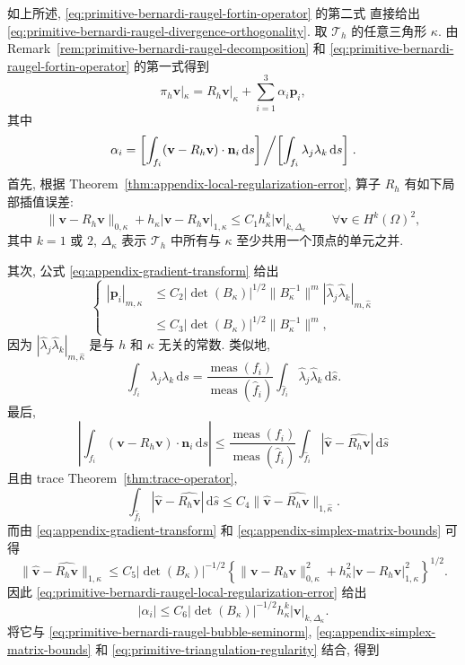 \begin{Proof}
如上所述, \eqref{eq:primitive-bernardi-raugel-fortin-operator} 的第二式
直接给出 \eqref{eq:primitive-bernardi-raugel-divergence-orthogonality}.
取 $\mathcal{T}_h$ 的任意三角形 $\kappa$. 由
Remark~\ref{rem:primitive-bernardi-raugel-decomposition} 和
\eqref{eq:primitive-bernardi-raugel-fortin-operator} 的第一式得到
\[
\pi_h\mathbf v|_\kappa
=R_h\mathbf v|_\kappa+\sum_{i=1}^3\alpha_i\mathbf p_i,
\]
其中
\[
\alpha_i=
\left[\int_{f_i}(\mathbf v-R_h\mathbf v)\cdot\mathbf n_i\,\mathrm ds\right]
\left/\left[\int_{f_i}\lambda_j\lambda_k\,\mathrm ds\right]\right. .
\]
首先, 根据 Theorem~\ref{thm:appendix-local-regularization-error},
算子 $R_h$ 有如下局部插值误差:
\begin{equation}\label{eq:primitive-bernardi-raugel-local-regularization-error}
\|\mathbf v-R_h\mathbf v\|_{0,\kappa}
+h_\kappa|\mathbf v-R_h\mathbf v|_{1,\kappa}
\leq C_1h_\kappa^k|\mathbf v|_{k,\Delta_\kappa}
\qquad\forall\mathbf v\in H^k(\Omega)^2,
\end{equation}
其中 $k=1$ 或 $2$, $\Delta_\kappa$ 表示 $\mathcal{T}_h$ 中所有与
$\kappa$ 至少共用一个顶点的单元之并.

其次, 公式 \eqref{eq:appendix-gradient-transform} 给出
\begin{equation}\label{eq:primitive-bernardi-raugel-bubble-seminorm}
\left\{
\begin{aligned}
|\mathbf p_i|_{m,\kappa}
&\leq C_2|\det(B_\kappa)|^{1/2}
\|B_\kappa^{-1}\|^m
|\hat\lambda_j\hat\lambda_k|_{m,\hat\kappa}\\
&\leq C_3|\det(B_\kappa)|^{1/2}
\|B_\kappa^{-1}\|^m,
\end{aligned}
\right.
\end{equation}
因为 $|\hat\lambda_j\hat\lambda_k|_{m,\hat\kappa}$ 是与 $h$ 和
$\kappa$ 无关的常数. 类似地,
\[
\int_{f_i}\lambda_j\lambda_k\,\mathrm ds
=\frac{\operatorname{meas}(f_i)}{\operatorname{meas}(\hat f_i)}
\int_{\hat f_i}\hat\lambda_j\hat\lambda_k\,\mathrm d\hat s.
\]
最后,
\[
\left|\int_{f_i}(\mathbf v-R_h\mathbf v)\cdot\mathbf n_i\,\mathrm ds\right|
\leq\frac{\operatorname{meas}(f_i)}{\operatorname{meas}(\hat f_i)}
\int_{\hat f_i}|\hat{\mathbf v}-\widehat{R_h\mathbf v}|\,\mathrm d\hat s
\]
且由 trace Theorem~\ref{thm:trace-operator},
\[
\int_{\hat f_i}|\hat{\mathbf v}-\widehat{R_h\mathbf v}|\,\mathrm d\hat s
\leq C_4\|\hat{\mathbf v}-\widehat{R_h\mathbf v}\|_{1,\hat\kappa}.
\]
而由 \eqref{eq:appendix-gradient-transform} 和
\eqref{eq:appendix-simplex-matrix-bounds} 可得
\[
\|\hat{\mathbf v}-\widehat{R_h\mathbf v}\|_{1,\hat\kappa}
\leq C_5|\det(B_\kappa)|^{-1/2}
\left\{
\|\mathbf v-R_h\mathbf v\|_{0,\kappa}^2
+h_\kappa^2|\mathbf v-R_h\mathbf v|_{1,\kappa}^2
\right\}^{1/2}.
\]
因此 \eqref{eq:primitive-bernardi-raugel-local-regularization-error} 给出
\[
|\alpha_i|
\leq C_6|\det(B_\kappa)|^{-1/2}h_\kappa^k
|\mathbf v|_{k,\Delta_\kappa}.
\]
将它与 \eqref{eq:primitive-bernardi-raugel-bubble-seminorm},
\eqref{eq:appendix-simplex-matrix-bounds} 和
\eqref{eq:primitive-triangulation-regularity} 结合, 得到


\end{Proof}
